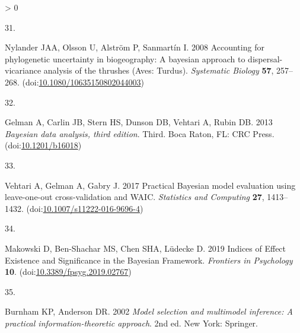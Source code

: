 \documentclass[
  a4paper,
]{article}
\newlength{\cslhangindent}
\newlength{\csllabelwidth}
\newenvironment{CSLReferences}[2] %
 {%
  \setlength{\parindent}{0pt}
  \ifodd #1 \everypar{\setlength{\hangindent}{\cslhangindent}}\ignorespaces\fi
  \ifnum #2 > 0
  \setlength{\parskip}{#2\baselineskip}
  \fi
 }%
 {}
\newcommand{\CSLLeftMargin}[1]{\parbox[t]{\csllabelwidth}{#1}}
\newcommand{\CSLRightInline}[1]{\parbox[t]{\linewidth - \csllabelwidth}{#1}\break}
\begin{document}
\begin{CSLReferences}{0}{0}
\leavevmode\hypertarget{ref-nylander2008}{}%
\CSLLeftMargin{31. }
\CSLRightInline{Nylander JAA, Olsson U, Alström P, Sanmartín I. 2008
Accounting for phylogenetic uncertainty in biogeography: {A} bayesian
approach to dispersal-vicariance analysis of the thrushes ({Aves}:
{Turdus}). \emph{Systematic Biology} \textbf{57}, 257--268.
(doi:\href{https://doi.org/10.1080/10635150802044003}{10.1080/10635150802044003})}

\leavevmode\hypertarget{ref-gelman2013}{}%
\CSLLeftMargin{32. }
\CSLRightInline{Gelman A, Carlin JB, Stern HS, Dunson DB, Vehtari A,
Rubin DB. 2013 \emph{Bayesian data analysis, third edition}. Third.
{Boca Raton, FL}: {CRC Press}.
(doi:\href{https://doi.org/10.1201/b16018}{10.1201/b16018})}

\leavevmode\hypertarget{ref-vehtari2017}{}%
\CSLLeftMargin{33. }
\CSLRightInline{Vehtari A, Gelman A, Gabry J. 2017 Practical {Bayesian}
model evaluation using leave-one-out cross-validation and {WAIC}.
\emph{Statistics and Computing} \textbf{27}, 1413--1432.
(doi:\href{https://doi.org/10.1007/s11222-016-9696-4}{10.1007/s11222-016-9696-4})}

\leavevmode\hypertarget{ref-makowski2019}{}%
\CSLLeftMargin{34. }
\CSLRightInline{Makowski D, Ben-Shachar MS, Chen SHA, Lüdecke D. 2019
Indices of {Effect Existence} and {Significance} in the {Bayesian
Framework}. \emph{Frontiers in Psychology} \textbf{10}.
(doi:\href{https://doi.org/10.3389/fpsyg.2019.02767}{10.3389/fpsyg.2019.02767})}

\leavevmode\hypertarget{ref-burnham2002}{}%
\CSLLeftMargin{35. }
\CSLRightInline{Burnham KP, Anderson DR. 2002 \emph{Model selection and
multimodel inference: A practical information-theoretic approach}. 2nd
ed. {New York}: {Springer}. }

\end{CSLReferences}
\end{document}
